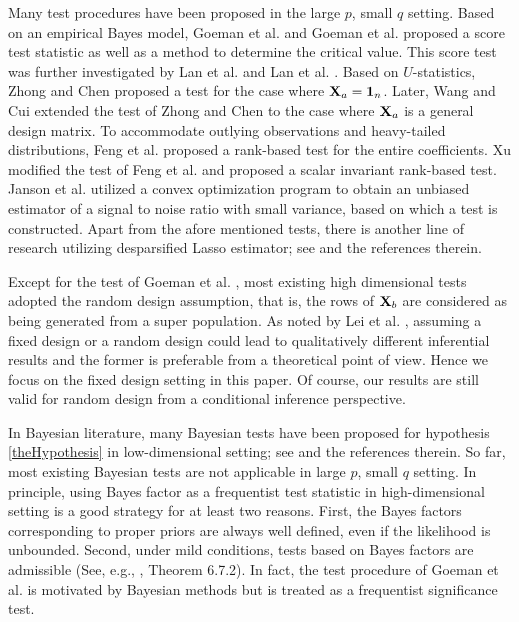 \documentclass[bj]{imsart}
\theoremstyle{plain}
\theoremstyle{definition}
\theoremstyle{remark}
\begin{document}
Many test procedures have been proposed in the large $p$, small $q$ setting.
Based on an empirical Bayes model, Goeman {\rm et al.} \cite{Goeman2006} and Goeman {\rm et al.} \cite{Goeman2011} proposed a score test statistic as well as a method to determine the critical value.
This score test was further investigated by Lan {\rm et al.} \cite{Lan2014Testing} and Lan {\rm et al.} \cite{Lan2016a}.
Based on $U$-statistics, Zhong and Chen \cite{Zhong2011Tests} proposed a test for the case where $\mathbf{X}_a=\mathbf 1_n$.
Later, Wang and Cui \cite{Wang2015} extended the test of Zhong and Chen \cite{Zhong2011Tests} to the case where $\mathbf{X}_a$ is a general design matrix.
To accommodate outlying observations and heavy-tailed distributions, Feng {et al.} \cite{Feng2013}
proposed a rank-based test for the entire coefficients.
Xu \cite{Xu2016a} modified the test of Feng {\rm et al.} \cite{Feng2013} and proposed a scalar invariant rank-based test.
Janson {et al.} \cite{Janson2016} utilized a convex optimization program to obtain an unbiased estimator of a signal to noise ratio with small variance, based on which a test is constructed.
Apart from the afore mentioned tests,
there is another line of research utilizing desparsified Lasso estimator; see \cite{Dezeure2017} and the references therein.

Except for the test of Goeman {\rm et al.} \cite{Goeman2006}, most existing high dimensional tests adopted the random design assumption, that is, the rows of $\mathbf{X}_b$ are considered as being generated from a super population.
As noted by Lei {\rm et al.} \cite{Lei2018}, assuming a fixed design or a random design could lead to qualitatively different inferential results and the former is preferable from a theoretical point of view.
Hence we focus on the fixed design setting in this paper.
Of course, our results are still valid for random design from a conditional inference perspective.




In Bayesian literature, many Bayesian tests have been proposed for hypothesis \eqref{theHypothesis} in low-dimensional setting; see \cite{javier2006Obj,Goddard2016,zhou2018On} and the references therein.
So far, most existing Bayesian tests are not applicable in large $p$, small $q$ setting.
In principle,
using Bayes factor as a frequentist test statistic in high-dimensional setting is a good strategy for at least two reasons.
First, the Bayes factors corresponding to proper priors are always well defined, even if the likelihood is unbounded.
Second, under mild conditions, tests based on Bayes factors are admissible (See, e.g., \cite{Lehmann}, Theorem 6.7.2).
In fact, the test procedure of Goeman {\rm et al.} \cite{Goeman2006} is motivated by Bayesian methods but is treated as a frequentist significance test.
\end{document}
